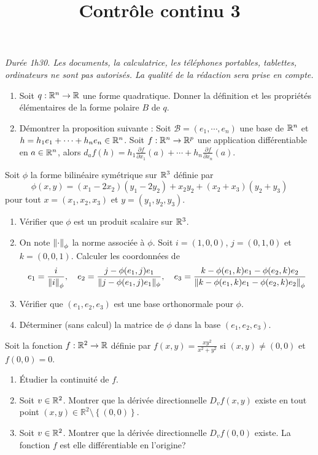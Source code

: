 \documentclass[a4paper]{tp_um}
\title{\large \sffamily\bfseries Contrôle continu 3}
\begin{document}
\maketitle
\textit{Durée 1h30. Les documents, la calculatrice, les téléphones portables, tablettes, ordinateurs ne sont pas autorisés. La qualité de la rédaction sera prise en compte.} 

\bigskip
\bigskip

\begin{enumerate}
	\item Soit $q:\mathbb{R}^n \to\mathbb{R}$ une forme quadratique. Donner la définition et les propriétés élémentaires de la forme polaire $B$ de $q$.
		\blanc{5cm}
	\item Démontrer la proposition suivante : Soit $\mathcal B = (e_1 ,\cdots , e_n )$ une base de $\mathbb{R}^n$ et $h = h_1 e_1 + \cdots + h_n e_n \in \mathbb{R}^n$. Soit $f : \mathbb{R}^n \to\mathbb{R}^p$ une application différentiable en $a \in \mathbb{R}^n$, alors $d_a f (h) = h_1 \frac{\partial f}{\partial x_1}(a) + \cdots+ h_n \frac{\partial f}{\partial x_n}(a)$.
		\blanc{8cm}
\end{enumerate}


\exo{} Soit $\phi$ la forme bilinéaire symétrique sur $\mathbb{R}^3$ définie par
\[
	\phi(x,y) = (x_1 - 2x_2)(y_1-2y_2) + x_2y_2 + (x_2+x_3)(y_2 + y_3)
\]
pour tout $x=(x_1,x_2,x_3)$ et $y=(y_1,y_2,y_3)$.
\begin{enumerate}
	\item Vérifier que $\phi$ est un produit scalaire sur $\mathbb{R}^3$.
		\blanc{8cm}
	\item  On note $\left\lVert\cdot\right\rVert_\phi$ la norme associée à $\phi$. Soit $i=(1,0,0)$, $j=(0,1,0)$ et $k =(0,0,1)$. Calculer les coordonnées de 
\[
		e_1 = \frac{i}{\left\lVert i\right\rVert_\phi}, \quad  e_2 = \frac{j - \phi(e_1,j)e_1}{\lVert j - \phi(e_1,j)e_1\rVert_\phi}, \quad  e_3 = \frac{k - \phi(e_1,k)e_1 - \phi(e_2,k)e_2}{\left\lVert k - \phi(e_1,k)e_1 - \phi(e_2,k)e_2\right\rVert_\phi}
	\]
		\blanc{15cm}
	\item Vérifier que $(e_1,e_2,e_3)$ est une base orthonormale pour $\phi$.
		\blanc{8cm}
	\item Déterminer (sans calcul) la matrice de $\phi$ dans la base $(e_1,e_2,e_3)$.
		\blanc{8cm}
\end{enumerate}

\pagebreak	
		
\exo{}Soit la fonction $f:\mathbb{R}^2 \to \mathbb{R}$ définie par $f(x,y) = \frac{xy^2}{x^2 + y^2}$ si $(x,y) \neq (0,0)$ et $f(0,0) = 0$.
\begin{enumerate}
	\item  \'Etudier la continuité de $f$.
		\blanc{8cm}
	\item Soit $v \in \mathbb{R}^2$. Montrer que la dérivée directionnelle $D_v f(x,y)$ existe en tout point $(x,y)\in\mathbb R^2 \setminus\left\{ (0,0) \right\}$.
		\blanc{5cm}
	\item Soit $v \in \mathbb{R}^2$. Montrer que la dérivée directionnelle $D_v f(0,0)$ existe. La fonction $f$ est elle différentiable en l'origine?
		\blanc{8cm}
\end{enumerate}	
	
\end{document}
